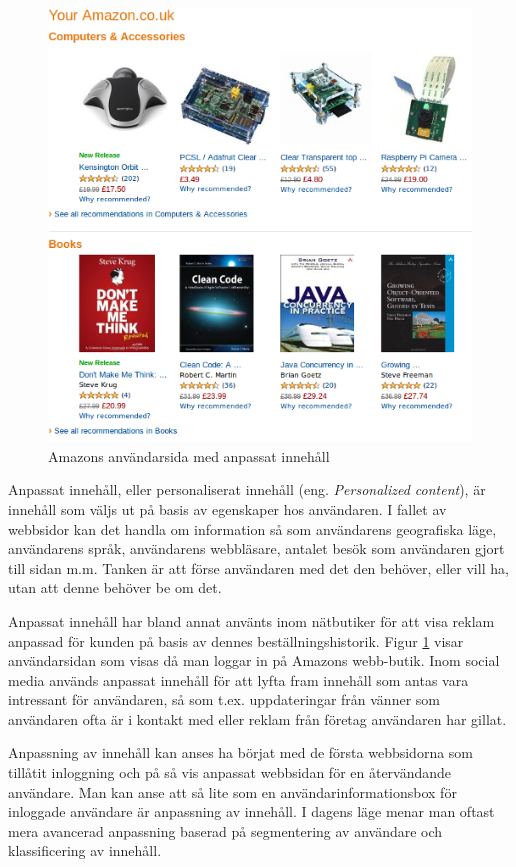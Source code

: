 \begin{figure}[h!]
\centering
\includegraphics[width=120mm]{assets/images/amazon.png}
\caption{Amazons användarsida med anpassat innehåll}
\label{amazon}
\end{figure}

Anpassat innehåll, eller personaliserat innehåll (eng. \textit{Personalized content}), är innehåll som väljs ut på basis av egenskaper hos användaren. I fallet av webbsidor kan det handla om information så som användarens geografiska läge, användarens språk, användarens webbläsare, antalet besök som användaren gjort till sidan m.m. Tanken är att förse användaren med det den behöver, eller vill ha, utan att denne behöver be om det. \citep{cotacm43}

Anpassat innehåll har bland annat använts inom nätbutiker för att visa reklam anpassad för kunden på basis av dennes beställningshistorik. Figur \ref{amazon} visar användarsidan som visas då man loggar in på Amazons webb-butik. Inom social media används anpassat innehåll för att lyfta fram innehåll som antas vara intressant för användaren, så som t.ex. uppdateringar från vänner som användaren ofta är i kontakt med eller reklam från företag användaren har gillat. \citep{socialmedia}

Anpassning av innehåll kan anses ha börjat med de första webbsidorna som tillåtit inloggning och på så vis anpassat webbsidan för en återvändande användare. Man kan anse att så lite som en användarinformationsbox för inloggade användare är anpassning av innehåll. I dagens läge menar man oftast mera avancerad anpassning baserad på segmentering av användare och klassificering av innehåll.

